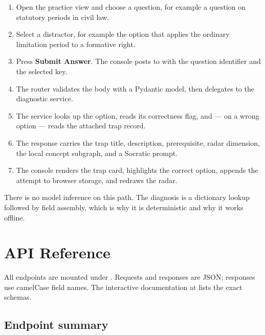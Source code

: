 \documentclass[11pt,a4paper]{article}
\newcommand{\code}[1]{\texttt{\small\detokenize{#1}}}
\begin{document}
\begin{enumerate}[leftmargin=1.6em,itemsep=0.3em]
  \item Open the practice view and choose a question, for example a question on statutory periods in civil law.
  \item Select a distractor, for example the option that applies the ordinary limitation period to a formative right.
  \item Press \textbf{Submit Answer}. The console posts to \code{POST /api/diagnose} with the question identifier and the selected key.
  \item The router validates the body with a Pydantic model, then delegates to the diagnostic service.
  \item The service looks up the option, reads its correctness flag, and --- on a wrong option --- reads the attached trap record.
  \item The response carries the trap title, description, prerequisite, radar dimension, the local concept subgraph, and a Socratic prompt.
  \item The console renders the trap card, highlights the correct option, appends the attempt to browser storage, and redraws the radar.
\end{enumerate}

There is no model inference on this path. The diagnosis is a dictionary lookup followed by field assembly, which is
why it is deterministic and why it works offline.

\section{API Reference}
\label{sec:api}

All endpoints are mounted under \code{/api}. Requests and responses are JSON; responses use camelCase field names.
The interactive documentation at \code{/docs} lists the exact schemas.

\subsection{Endpoint summary}
\end{document}
